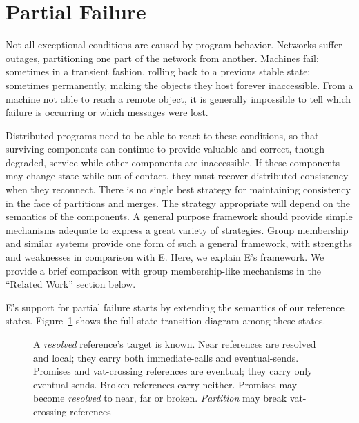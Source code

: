 \documentclass{llncs}
\begin{document}
\section{Partial Failure}

Not all exceptional conditions are caused by program behavior.
Networks suffer outages, partitioning one part of the network from
another. Machines fail: sometimes in a transient fashion, rolling back
to a previous stable state; sometimes permanently, making the objects
they host forever inaccessible. From a machine not able to reach a
remote object, it is generally impossible to tell which failure is
occurring or which messages were lost.

Distributed programs need to be able to react to these conditions, so
that surviving components can continue to provide valuable and
correct, though degraded, service while other components are
inaccessible. If these components may change state while out of
contact, they must recover distributed consistency when they
reconnect. There is no single best strategy for maintaining
consistency in the face of partitions and merges. The strategy
appropriate will depend on the semantics of the components. A general
purpose framework should provide simple mechanisms adequate to express
a great variety of strategies. Group membership and similar systems
provide one form of such a general framework, with strengths and
weaknesses in comparison with E. Here, we explain E's framework. We
provide a brief comparison with group membership-like mechanisms in
the ``Related Work'' section below.

E's support for partial failure starts by extending the semantics of
our reference states. Figure~\ref{fig:refstates} shows the full state
transition diagram among these states.

\begin{figure}
\centerline{}
\caption{A \emph{resolved} reference's target is known. Near
  references are resolved and local; they carry both immediate-calls
  and eventual-sends. Promises and vat-crossing references are
  eventual; they carry only eventual-sends. Broken references carry
  neither. Promises may become \emph{resolved} to near, far or
  broken. \emph{Partition} may break vat-crossing references}
\label{fig:refstates}
\end{figure}
\end{document}
